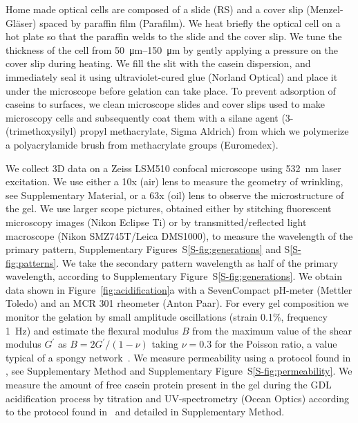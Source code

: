 \documentclass[twocolumn,superscriptaddress,showpacs,preprintnumbers, amsmath,amssymb,prl]{revtex4-1}
\begin{document}
Home made optical cells are composed of a slide (RS) and a cover slip (Menzel-Gl\"aser) spaced by paraffin film (Parafilm). We heat briefly the optical cell on a hot plate so that the paraffin welds to the slide and the cover slip. We tune the thickness of the cell from \SIrange{50}{150}{\micro\metre} by gently applying a pressure on the cover slip during heating. We fill the slit with the casein dispersion, and immediately seal it using ultraviolet-cured glue (Norland Optical) and place it under the microscope before gelation can take place. To prevent adsorption of caseins to surfaces, we clean microscope slides and cover slips used to make microscopy cells and subsequently coat them with a silane agent (3-(trimethoxysilyl) propyl methacrylate, Sigma Aldrich) from which we polymerize a polyacrylamide brush from methacrylate groups (Euromedex).

We collect 3D data on a Zeiss LSM510 confocal microscope using \SI{532}{\nano\meter} laser excitation. We use either a 10x (air) lens to measure the geometry of wrinkling, see Supplementary Material, or a 63x (oil) lens to observe the microstructure of the gel. We use larger scope pictures, obtained either by stitching fluorescent microscopy images (Nikon Eclipse Ti) or by transmitted/reflected light macroscope (Nikon SMZ745T/Leica DMS1000), to measure the wavelength of the primary pattern, Supplementary Figures~S\ref{S-fig:generations} and S\ref{S-fig:patterns}. We take the secondary pattern wavelength as half of the primary wavelength, according to Supplementary Figure~S\ref{S-fig:generations}.
We obtain data shown in Figure~\ref{fig:acidification}a with a SevenCompact pH-meter (Mettler Toledo) and an MCR 301 rheometer (Anton Paar). For every gel composition we monitor the gelation by small amplitude oscillations (strain 0.1\%, frequency \SI{1}{\hertz}) and estimate the flexural modulus $B$ from the maximum value of the shear modulus $G^\prime$ as $B=2G^\prime/(1-\nu)$ taking $\nu=0.3$ for the Poisson ratio, a value typical of a spongy network~\cite{Greaves2011}.
We measure permeability using a protocol found in \cite{VanDijk1986}, see Supplementary Method and Supplementary Figure~S\ref{S-fig:permeability}. We measure the amount of free casein protein present in the gel during the GDL acidification process by titration and UV-spectrometry (Ocean Optics) according to the protocol found in~\cite{Roefs1986} and detailed in Supplementary Method.



\end{document}

